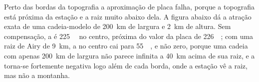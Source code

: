 Perto das bordas da topografia a aproximação de placa falha, porque a topografia está próxima da estação e a raiz muito abaixo dela. A figura abaixo
dá a atração exata de uma cadeia-modelo de \qty{200}{km} de largura e \qty{2}{km}
de altura. Sem compensação, a  é
\qty{+225}{\milli\gal} no centro, próxima do valor da placa de
\qty{226}{\milli\gal}; com uma raiz de Airy de \qty{9}{km}, a  no centro
cai para \qty{+55}{\milli\gal}, e não zero, porque uma cadeia com apenas
\qty{200}{km} de largura não parece infinita a \qty{40}{km} acima de sua raiz, e
a  torna-se fortemente negativa logo além de cada borda, onde a
estação vê a raiz, mas não a montanha.

